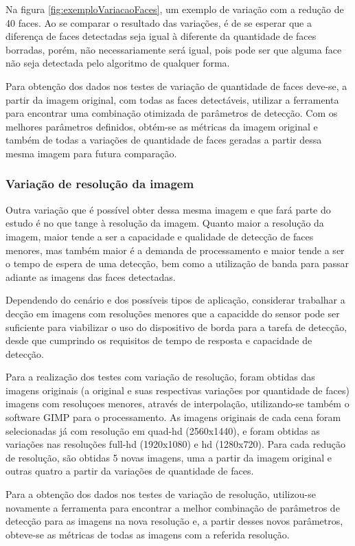 Na figura \ref{fig:exemploVariacaoFaces}, um exemplo de variação com a redução de 40 faces. Ao se comparar o resultado das variações, é de se esperar que a diferença de faces detectadas seja igual à diferente da quantidade de faces borradas, porém, não necessariamente será igual, pois pode ser que alguma face não seja detectada pelo algoritmo de qualquer forma.

Para obtenção dos dados nos testes de variação de quantidade de faces deve-se, a partir da imagem original, com todas as faces detectáveis, utilizar a ferramenta para encontrar uma combinação otimizada de parâmetros de detecção. Com os melhores parâmetros definidos, obtém-se as métricas da imagem original e também de todas a variações de quantidade de faces geradas a partir dessa mesma imagem para futura comparação.

\subsubsection{Variação de resolução da imagem}

Outra variação que é possível obter dessa mesma imagem e que fará parte do estudo é no que tange à resolução da imagem. Quanto maior a resolução da imagem, maior tende a ser a capacidade e qualidade de detecção de faces menores, mas também maior é a demanda de processamento e maior tende a ser o tempo de espera de uma detecção, bem como a utilização de banda para passar adiante as imagens das faces detectadas.

Dependendo do cenário e dos possíveis tipos de aplicação, considerar trabalhar a decção em imagens com resoluções menores que a capacidde do sensor pode ser suficiente para viabilizar o uso do dispositivo de borda para a tarefa de detecção, desde que cumprindo os requisitos de tempo de resposta e capacidade de detecção.

Para a realização dos testes com variação de resolução, foram obtidas das imagens originais (a original e suas respectivas variações por quantidade de faces) imagens com resoluçoes menores, através de interpolação, utilizando-se também o software GIMP para o processamento. As imagens originais de cada cena foram selecionadas já com resolução em quad-hd (2560x1440), e foram obtidas as variações nas resoluções full-hd (1920x1080) e hd (1280x720). Para cada redução de resolução, são obtidas 5 novas imagens, uma a partir da imagem original e outras quatro a partir da variações de quantidade de faces.

Para a obtenção dos dados nos testes de variação de resolução, utilizou-se novamente a ferramenta para encontrar a melhor combinação de parâmetros de detecção para as imagens na nova resolução e, a partir desses novos parâmetros, obteve-se as métricas de todas as imagens com a referida resolução.


